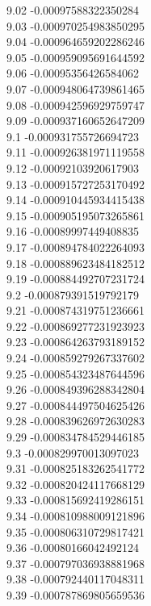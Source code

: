 {9.02	-0.00097588322350284\\
9.03	-0.000970254983850295\\
9.04	-0.000964659202286246\\
9.05	-0.000959095691644592\\
9.06	-0.00095356426584062\\
9.07	-0.000948064739861465\\
9.08	-0.000942596929759747\\
9.09	-0.000937160652647209\\
9.1	-0.000931755726694723\\
9.11	-0.000926381971119558\\
9.12	-0.00092103920617903\\
9.13	-0.000915727253170492\\
9.14	-0.000910445934415438\\
9.15	-0.000905195073265861\\
9.16	-0.00089997449408835\\
9.17	-0.000894784022264093\\
9.18	-0.000889623484182512\\
9.19	-0.000884492707231724\\
9.2	-0.000879391519792179\\
9.21	-0.000874319751236661\\
9.22	-0.000869277231923923\\
9.23	-0.000864263793189152\\
9.24	-0.000859279267337602\\
9.25	-0.000854323487644596\\
9.26	-0.000849396288342804\\
9.27	-0.000844497504625426\\
9.28	-0.000839626972630283\\
9.29	-0.000834784529446185\\
9.3	-0.000829970013097023\\
9.31	-0.000825183262541772\\
9.32	-0.000820424117668129\\
9.33	-0.000815692419286151\\
9.34	-0.000810988009121896\\
9.35	-0.000806310729817421\\
9.36	-0.00080166042492124\\
9.37	-0.000797036938881968\\
9.38	-0.000792440117048311\\
9.39	-0.000787869805659536\\
}
